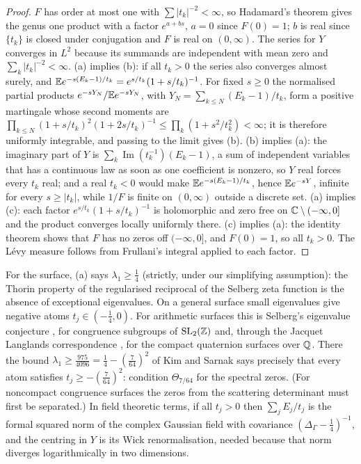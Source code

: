 \begin{proof}
$F$ has order at most one with $\sum|t_k|^{-2}<\infty$, so Hadamard's theorem gives the genus one product with a factor $e^{a+bs}$, $a = 0$ since $F(0)=1$; $b$ is real since $\{t_k\}$ is closed under conjugation and $F$ is real on $(0,\infty)$. The series for $Y$ converges in $L^2$ because its summands are independent with mean zero and $\sum_k|t_k|^{-2}<\infty$. (a) implies (b): if all $t_k>0$ the series also converges almost surely, and $\mathbb{E} e^{-s(E_k-1)/t_k} = e^{s/t_k}(1+s/t_k)^{-1}$. For fixed $s\ge0$ the normalised partial products $e^{-sY_N}/\mathbb{E} e^{-sY_N}$, with $Y_N = \sum_{k\le N}(E_k-1)/t_k$, form a positive martingale whose second moments are $\prod_{k\le N}(1+s/t_k)^2(1+2s/t_k)^{-1}\le\prod_k(1+s^2/t_k^2)<\infty$; it is therefore uniformly integrable, and passing to the limit gives (b). (b) implies (a): the imaginary part of $Y$ is $\sum_k\operatorname{Im}(t_k^{-1})(E_k-1)$, a sum of independent variables that has a continuous law as soon as one coefficient is nonzero, so $Y$ real forces every $t_k$ real; and a real $t_k<0$ would make $\mathbb{E} e^{-s(E_k-1)/t_k}$, hence $\mathbb{E} e^{-sY}$, infinite for every $s\ge|t_k|$, while $1/F$ is finite on $(0,\infty)$ outside a discrete set. (a) implies (c): each factor $e^{s/t_k}(1+s/t_k)^{-1}$ is holomorphic and zero free on $\mathbb{C}\setminus(-\infty,0]$ and the product converges locally uniformly there. (c) implies (a): the identity theorem shows that $F$ has no zeros off $(-\infty,0]$, and $F(0) = 1$, so all $t_k>0$. The L\'evy measure follows from Frullani's integral applied to each factor.
\end{proof}

For the surface, (a) says $\lambda_1\ge\frac14$ (strictly, under our simplifying assumption): the Thorin property of the regularised reciprocal of the Selberg zeta function is the absence of exceptional eigenvalues. On a general surface small eigenvalues give negative atoms $t_j\in(-\frac14,0)$. For arithmetic surfaces this is Selberg's eigenvalue conjecture \cite{selberg1965}, for congruence subgroups of $\mathrm{SL}_2(\mathbb{Z})$ and, through the Jacquet Langlands correspondence \cite{jacquetlanglands1970}, for the compact quaternion surfaces over $\mathbb{Q}$. There the bound $\lambda_1\ge\frac{975}{4096} = \frac14-(\frac7{64})^2$ of Kim and Sarnak \cite{kimsarnak2003} says precisely that every atom satisfies $t_j\ge-(\frac7{64})^2$: condition $\Theta_{7/64}$ for the spectral zeros. (For noncompact congruence surfaces the zeros from the scattering determinant must first be separated.) In field theoretic terms, if all $t_j>0$ then $\sum_jE_j/t_j$ is the formal squared norm of the complex Gaussian field with covariance $(\Delta_\Gamma-\frac14)^{-1}$, and the centring in $Y$ is its Wick renormalisation, needed because that norm diverges logarithmically in two dimensions.


